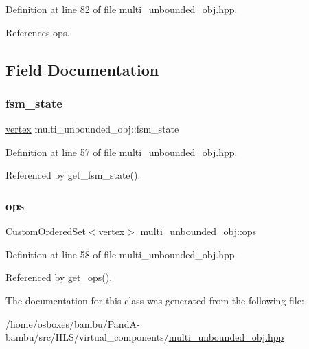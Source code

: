 Definition at line 82 of file multi\+\_\+unbounded\+\_\+obj.\+hpp.



References ops.



\subsection{Field Documentation}
\mbox{\label{classmulti__unbounded__obj_a7cde2f620698f221171e6912d2ecae09}} 
\subsubsection{\texorpdfstring{fsm\+\_\+state}{fsm\_state}}
{\footnotesize\ttfamily \hyperlink{graph_8hpp_abefdcf0544e601805af44eca032cca14}{vertex} multi\+\_\+unbounded\+\_\+obj\+::fsm\+\_\+state\hspace{0.3cm}{\ttfamily [private]}}



Definition at line 57 of file multi\+\_\+unbounded\+\_\+obj.\+hpp.



Referenced by get\+\_\+fsm\+\_\+state().

\mbox{\label{classmulti__unbounded__obj_aeef3ef0565db139f60e4f63abfc52780}} 
\subsubsection{\texorpdfstring{ops}{ops}}
{\footnotesize\ttfamily \hyperlink{classCustomOrderedSet}{Custom\+Ordered\+Set}$<$\hyperlink{graph_8hpp_abefdcf0544e601805af44eca032cca14}{vertex}$>$ multi\+\_\+unbounded\+\_\+obj\+::ops\hspace{0.3cm}{\ttfamily [private]}}



Definition at line 58 of file multi\+\_\+unbounded\+\_\+obj.\+hpp.



Referenced by get\+\_\+ops().



The documentation for this class was generated from the following file\+:\begin{DoxyCompactItemize}
\item 
/home/osboxes/bambu/\+Pand\+A-\/bambu/src/\+H\+L\+S/virtual\+\_\+components/\hyperlink{multi__unbounded__obj_8hpp}{multi\+\_\+unbounded\+\_\+obj.\+hpp}\end{DoxyCompactItemize}
